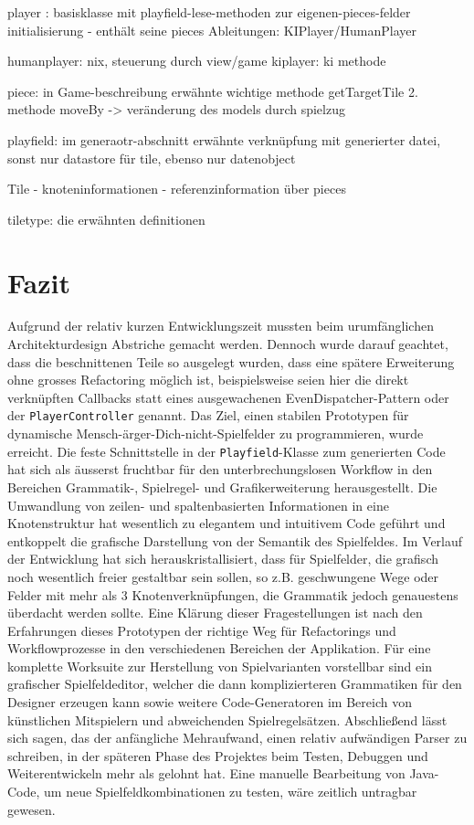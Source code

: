 \documentclass[conference]{IEEEtran}
\begin{document}
player : basisklasse mit playfield-lese-methoden zur eigenen-pieces-felder initialisierung
      - enth\"alt seine pieces
      Ableitungen: KIPlayer/HumanPlayer

humanplayer: nix, steuerung durch view/game
kiplayer: ki methode

piece: in Game-beschreibung erw\"ahnte wichtige methode getTargetTile
2. methode moveBy -> ver\"anderung des models durch spielzug

playfield: im generaotr-abschnitt erw\"ahnte verkn\"upfung mit generierter datei, sonst nur datastore f\"ur tile, ebenso nur datenobject

Tile 
  - knoteninformationen
  - referenzinformation \"uber pieces


tiletype: die erw\"ahnten definitionen

\section{Fazit}

Aufgrund der relativ kurzen Entwicklungszeit mussten beim urumf\"anglichen Architekturdesign Abstriche gemacht werden.
Dennoch wurde darauf geachtet, dass die beschnittenen Teile so ausgelegt wurden, dass eine sp\"atere Erweiterung
ohne grosses Refactoring m\"oglich ist, beispielsweise seien hier die direkt verkn\"upften Callbacks statt eines ausgewachenen EvenDispatcher-Pattern oder der \texttt{PlayerController} genannt. Das Ziel, einen stabilen Prototypen f\"ur dynamische Mensch-\"arger-Dich-nicht-Spielfelder zu programmieren, wurde erreicht. Die feste Schnittstelle in der \texttt{Playfield}-Klasse zum generierten Code hat sich als \"ausserst fruchtbar f\"ur den unterbrechungslosen Workflow in den Bereichen Grammatik-, Spielregel- und Grafikerweiterung herausgestellt. Die Umwandlung von zeilen- und spaltenbasierten Informationen in eine Knotenstruktur hat wesentlich zu elegantem und intuitivem Code gef\"uhrt und entkoppelt die grafische Darstellung von der Semantik des Spielfeldes. Im Verlauf der Entwicklung hat sich herauskristallisiert, dass f\"ur Spielfelder, die grafisch noch wesentlich freier gestaltbar sein sollen, so z.B. geschwungene Wege oder Felder mit mehr als 3 Knotenverkn\"upfungen, die Grammatik jedoch genauestens \"uberdacht werden sollte. Eine Kl\"arung dieser Fragestellungen ist nach den Erfahrungen dieses Prototypen der richtige Weg f\"ur Refactorings und Workflowprozesse in den verschiedenen Bereichen der Applikation. F\"ur eine komplette Worksuite zur Herstellung von Spielvarianten vorstellbar sind ein grafischer Spielfeldeditor, welcher die dann komplizierteren Grammatiken f\"ur den Designer erzeugen kann sowie weitere Code-Generatoren im Bereich von k\"unstlichen Mitspielern und abweichenden Spielregels\"atzen. Abschließend l\"asst sich sagen, das der anf\"angliche Mehraufwand, einen relativ aufw\"andigen Parser zu schreiben, in der sp\"ateren Phase des Projektes beim Testen, Debuggen und Weiterentwickeln mehr als gelohnt hat. Eine manuelle Bearbeitung von Java-Code, um neue Spielfeldkombinationen zu testen, w\"are zeitlich untragbar gewesen.






\end{document}
